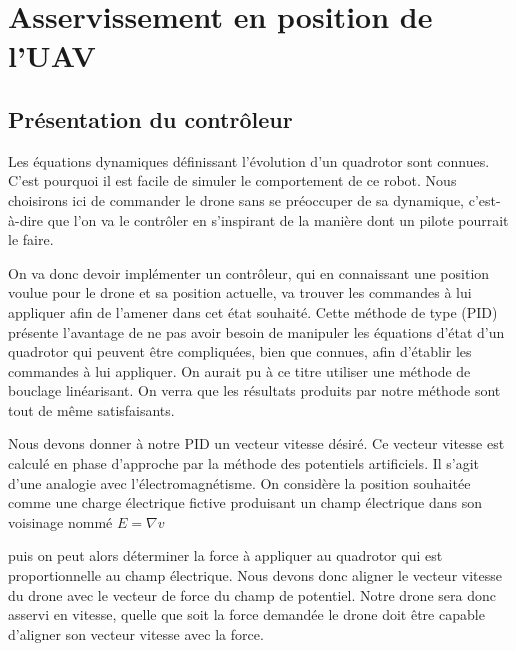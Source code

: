 \section{Asservissement en position de l'UAV}

\subsection{Présentation du contrôleur}

Les équations dynamiques définissant l’évolution d’un quadrotor sont connues. C’est pourquoi il est facile de simuler le comportement de ce robot. 
Nous choisirons ici de commander le drone sans se préoccuper de sa dynamique, 
c'est-à-dire que l’on va le contrôler en s’inspirant de la manière dont un pilote pourrait le faire.


On va donc devoir implémenter un contrôleur, qui en connaissant une position voulue pour le drone et sa position actuelle, 
va trouver les commandes à lui appliquer afin de l'amener dans cet état souhaité. Cette méthode de type (PID) présente 
l’avantage de ne pas avoir besoin de manipuler les équations d’état d’un quadrotor qui peuvent être compliquées, 
bien que connues, afin d’établir les commandes à lui appliquer. On aurait pu à ce titre utiliser une méthode de bouclage linéarisant. 
On verra que les résultats produits par notre méthode sont tout de même satisfaisants.

Nous devons donner à notre PID un vecteur vitesse désiré. 
Ce vecteur vitesse est calculé en phase d’approche par la méthode des potentiels artificiels. 
Il s’agit d’une analogie avec l’électromagnétisme. On considère la position souhaitée comme une charge électrique fictive 
produisant un champ électrique dans son voisinage nommé $ E = \nabla v $ 

puis on peut alors déterminer la force à  appliquer au quadrotor qui est proportionnelle au champ électrique. 
Nous devons donc aligner le vecteur vitesse du drone avec le vecteur de force du champ de potentiel. Notre drone sera donc asservi en vitesse, 
quelle que soit la force demandée le drone doit être capable d’aligner son vecteur vitesse avec la force. 

